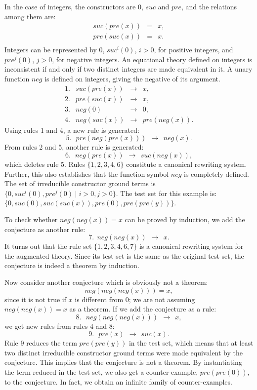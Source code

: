 In the case of integers, the
constructors are $0$, ${suc}$ and ${pre}$, and the relations
among them are:
 \[\begin{array}{lcl}
  suc(pre(x)) & = & x, \\ 
  pre(suc(x)) & = & x. \\
 \end{array}\]
Integers can be represented by $0$, $suc^i(0)$, $i > 0$, for positive
integers, and $pre^j(0)$, $j > 0$, for negative integers. An
equational theory defined on integers is inconsistent if and only if
two distinct integers are made equivalent in it.
A unary function $neg$ is defined on integers, giving the negative of 
its argument.
\[\begin{array}{rlcl}
  1. & suc(pre(x)) & \rightarrow & x, \\
  2. & pre(suc(x)) & \rightarrow & {x}, \\ 
  3. & neg(0) & \rightarrow & {0}, \\
  4. & {neg}(suc(x))  & \rightarrow & pre(neg(x)).
\end{array}\]
Using rules 1 and 4, a new rule is generated: 
  \[ {5.} ~~~ pre(neg(pre(x))) ~~ \rightarrow ~~ neg(x). \]
 From rules 2 and 5, another rule is generated:
  \[ {6.}~~~ neg(pre(x)) ~~ \rightarrow ~~ suc(neg(x)), \]
which deletes rule 5. Rules $\{1, 2, 3, 4, 6 \}$ 
constitute a canonical rewriting system. Further, this also
establishes that the function symbol $neg$ is completely defined. The
set of irreducible constructor ground terms is 
$\{ 0, suc^i(0), pre^j(0) \mid i > 0, j > 0 \}$. 
The test set for this example is: 
$\{ 0, suc(0), suc(suc(x)), pre(0), pre(pre(y))
\}$.

To check whether $neg(neg(x)) = x$ can be proved by induction, 
we add the conjecture as another rule:
 \[ 7.~~ neg(neg(x)) ~~\rightarrow~~ {x.}\]
It turns out that the rule set $\{1, 2, 3, 4, 6, 7 \}$ is a canonical
rewriting system for the augmented theory. Since its test set is the
same as the original test set, the conjecture is indeed a theorem by
induction.

Now consider another conjecture which is obviously not a theorem:
  \[ neg(neg(neg(x))) = x, \]
since it is not true if $x$ is different from $0$;
we are not assuming $neg(neg(x)) = x$ as a theorem.
If we add the conjecture as a rule:
 \[ 8. ~~~ {neg}(neg(neg(x))) ~~\rightarrow ~~ x,\]
we get new rules from rules 4 and 8:
 \[ 9. ~~~ {pre}(x) ~~\rightarrow~~ suc(x). \]
Rule 9 reduces the term $pre(pre(y))$ in the test set,
which means that at least two distinct irreducible constructor ground
terms were made equivalent by the conjecture. This implies that the
conjecture is not a theorem.  By instantiating the term reduced in the
test set, we also get a counter-example, $pre(pre(0))$, to
the conjecture.  In fact, we obtain an infinite family of
counter-examples.


